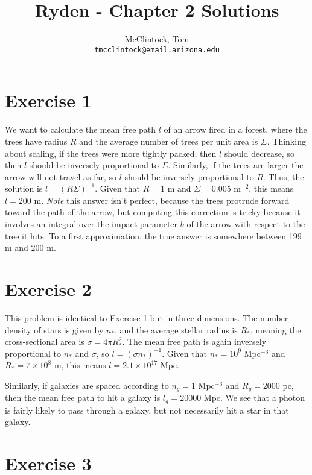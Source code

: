 \documentclass[12pt,a4paper]{article}
\author{
  McClintock, Tom\\
  \texttt{tmcclintock@email.arizona.edu}
}
\title{Ryden - Chapter 2 Solutions}
\begin{document}
\maketitle

\section{Exercise 1}
\label{sec:c1ex1}

We want to calculate the mean free path $l$ of an arrow fired in a forest, where the trees have radius $R$ and the average number of trees per unit area is $\Sigma$. Thinking about scaling, if the trees were more tightly packed, then $l$ should decrease, so then $l$ should be inversely proportional to $\Sigma$. Similarly, if the trees are larger the arrow will not travel as far, so $l$ should be inversely proportional to $R$. Thus, the solution is $l=(R\Sigma)^{-1}$. Given that $R=1$ m and $\Sigma = 0.005$ m$^{-2}$, this means $l=200$ m. {\it Note} this answer isn't perfect, because the trees protrude forward toward the path of the arrow, but computing this correction is tricky because it involves an integral over the impact parameter $b$ of the arrow with respect to the tree it hits. To a first approximation, the true answer is somewhere between 199 m and 200 m.

\section{Exercise 2}
\label{sec:c1ex2}

This problem is identical to Exercise 1 but in three dimensions. The number density of stars is given by $n_*$, and the average stellar radius is $R_*$, meaning the cross-sectional area is $\sigma = 4\pi R_*^2$. The mean free path is again inversely proportional to $n_*$ and $\sigma$, so $l=(\sigma n_*)^{-1}$. Given that $n_* = 10^9$ Mpc$^{-3}$ and $R_* = 7\times 10^8$ m, this means $l = 2.1\times 10^{17}$ Mpc.

Similarly, if galaxies are spaced according to $n_g= 1$ Mpc$^{-3}$ and $R_g=2000$ pc, then the mean free path to hit a galaxy is $l_g = 20000$ Mpc. We see that a photon is fairly likely to pass through a galaxy, but not necessarily hit a star in that galaxy.

\section{Exercise 3}
\label{sec:c1ex3}
\end{document}
